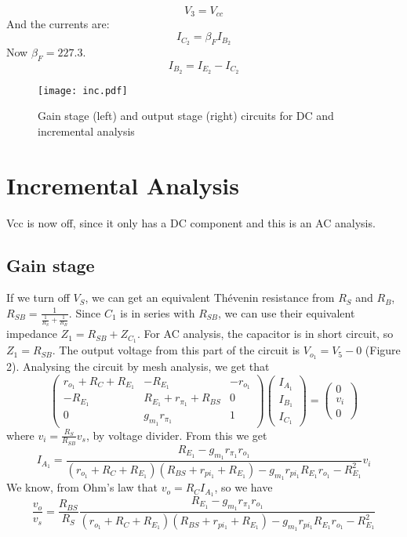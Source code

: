 \begin{equation} 
V_3=V_{cc}
\end{equation}
And the currents are:
\begin{equation}
    I_{C_2}=\beta_F I_{B_2}
\end{equation}
Now $\beta_F=227.3$.
\begin{equation}
    I_{B_2}=I_{E_2}-I_{C_2}
\end{equation}
\begin{figure}[H] \centering
\texttt{[image: inc.pdf]}
\caption{Gain stage (left) and output stage (right) circuits for DC and incremental analysis}
\label{fig:oc2}
\end{figure} 
\section{Incremental Analysis}
Vcc is now off, since it only has a DC component and this is an AC analysis.
\subsection{Gain stage}
If we turn off $V_S$, we can get an equivalent Thévenin resistance from $R_S$ and $R_B$, $R_{SB}=\frac{1}{\frac{1}{R_S}+\frac{1}{R_B}}$. Since $C_1$ is in series with $R_{SB}$, we can use their equivalent impedance $Z_1=R_{SB}+Z_{C_1}$. For AC analysis, the capacitor is in short circuit, so $Z_1=R_{SB}$.  The output voltage from this part of the circuit is $V_{o_1}=V_5-0$ (Figure 2). Analysing the circuit by mesh analysis, we get that 
\begin{equation}
\left(\begin{array}{ccc}  r_{o_1}+R_C+R_{E_1} & -R_{E_1} & -r_{o_1}\\
-R_{E_1} & R_{E_1}+r_{\pi_1}+R_{BS} & 0\\ 0 & g_{m_1}r_{\pi_1} & 1
\end{array}\right)
\left(\begin{array}{c} I_{A_1} \\ I_{B_1} \\ I_{C_1}  \end{array}\right) 
= \left(\begin{array}{c}  0 \\ v_i \\0 \end{array}\right)
\end{equation}
where $v_i=\frac{R_S}{R_{SB}}v_s$, by voltage divider.
From this we get
\begin{equation}
    I_{A_1}=\frac{R_{E_1}-g_{m_1}r_{\pi_1} r_{o_1}}{(r_{o_1}+R_C+R_{E_1})(R_{BS}+r_{pi_1}+R_{E_1})-g_{m_1}r_{pi_1}R_{E_1}r_{o_1}-R_{E_1}^2}v_i
\end{equation}
We know, from Ohm's law that $v_o=R_C I_{A_1}$, so we have
\begin{equation}
    \frac{v_o}{v_s}=\frac{R_{BS}}{R_S}\frac{R_{E_1}-g_{m_1}r_{\pi_1} r_{o_1}}{(r_{o_1}+R_C+R_{E_1})(R_{BS}+r_{pi_1}+R_{E_1})-g_{m_1}r_{pi_1}R_{E_1}r_{o_1}-R_{E_1}^2}
\end{equation}

